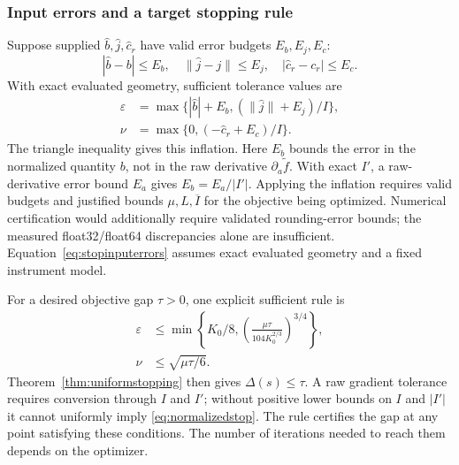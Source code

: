 \documentclass[10pt,a4paper]{article}
\begin{document}
\subsubsection{Input errors and a target stopping rule}
Suppose supplied $\widehat b,\widehat j,\widehat c_r$ have valid error budgets $E_b,E_j,E_c$:
\begin{equation}
 |\widehat b-b|\le E_b,\quad\|\widehat j-j\|\le E_j,
 \quad|\widehat c_r-c_r|\le E_c.
 \label{eq:stopinputerrors}
\end{equation}
With exact evaluated geometry, sufficient tolerance values are
\begin{equation}
 \begin{aligned}
 \varepsilon&=\max\{ |\widehat b|+E_b,
                         (\|\widehat j\|+E_j)/I\},\\
 \nu&=\max\{0,(-\widehat c_r+E_c)/I\}.
 \end{aligned}
 \label{eq:stopinflation}
\end{equation}
The triangle inequality gives this inflation. Here $E_b$ bounds the error in the normalized quantity $b$, not in the raw derivative $\partial_a\widetilde f$. With exact $I'$, a raw-derivative error bound $E_a$ gives $E_b=E_a/|I'|$. Applying the inflation requires valid budgets and justified bounds $\mu,L,\overline I$ for the objective being optimized. Numerical certification would additionally require validated rounding-error bounds; the measured float32/float64 discrepancies alone are insufficient. Equation~\eqref{eq:stopinputerrors} assumes exact evaluated geometry and a fixed instrument model.

For a desired objective gap $\tau>0$, one explicit sufficient rule is
\begin{equation}
 \begin{aligned}
 \varepsilon&\le\min\!\left\{K_0/8,
            \left(\frac{\mu\tau}{104K_0^{2/3}}\right)^{3/4}\right\},\\
 \nu&\le\sqrt{\mu\tau/6}.
 \end{aligned}
 \label{eq:targetstop}
\end{equation}
Theorem~\ref{thm:uniformstopping} then gives $\Delta(s)\le\tau$. A raw gradient tolerance requires conversion through $I$ and $I'$; without positive lower bounds on $I$ and $|I'|$ it cannot uniformly imply \eqref{eq:normalizedstop}. The rule certifies the gap at any point satisfying these conditions. The number of iterations needed to reach them depends on the optimizer.
\end{document}

